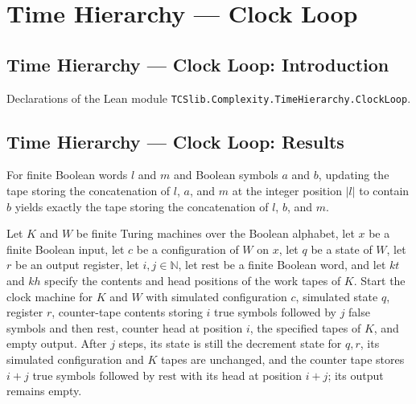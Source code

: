 \section{Time Hierarchy --- Clock Loop}
\subsection*{Time Hierarchy --- Clock Loop: Introduction}

Declarations of the Lean module \texttt{TCSlib.Complexity.TimeHierarchy.ClockLoop}.

\subsection*{Time Hierarchy --- Clock Loop: Results}

\begin{lemma}
\label{Complexity.TimeHierarchy.bufferTape_update_mid}
\leanok
{}
For finite Boolean words $l$ and $m$ and Boolean symbols $a$ and $b$, updating the tape
storing the concatenation of $l$, $a$, and $m$ at the integer position $|l|$ to contain
$b$ yields exactly the tape storing the concatenation of $l$, $b$, and $m$.
\end{lemma}

\begin{lemma}
\label{Complexity.TimeHierarchy.borrow_run}
\leanok
{}
Let $K$ and $W$ be finite Turing machines over the Boolean alphabet, let $x$ be a finite
Boolean input, let $c$ be a configuration of $W$ on $x$, let $q$ be a state of $W$, let
$r$ be an output register, let $i,j\in\mathbb{N}$, let $\mathrm{rest}$ be a finite
Boolean word, and let $kt$ and $kh$ specify the contents and head positions of the work
tapes of $K$. Start the clock machine for $K$ and $W$ with simulated configuration $c$,
simulated state $q$, register $r$, counter-tape contents storing $i$ true symbols
followed by $j$ false symbols and then $\mathrm{rest}$, counter head at position $i$,
the specified tapes of $K$, and empty output. After $j$ steps, its state is still the
decrement state for $q,r$, its simulated configuration and $K$ tapes are unchanged, and
the counter tape stores $i+j$ true symbols followed by $\mathrm{rest}$ with its head at
position $i+j$; its output remains empty.
\end{lemma}

